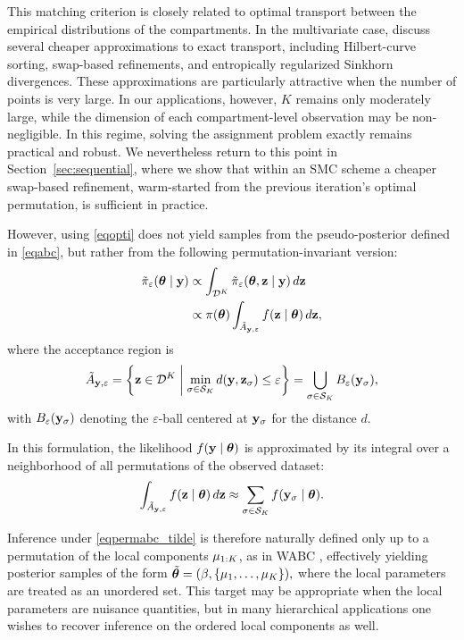 This matching criterion is closely related to optimal transport between the empirical distributions of the compartments. In the multivariate case, \citet{bernton2019approximate} discuss several cheaper approximations to exact transport, including Hilbert-curve sorting, swap-based refinements, and entropically regularized Sinkhorn divergences. These approximations are particularly attractive when the number of points is very large. In our applications, however, $K$ remains only moderately large, while the dimension of each compartment-level observation may be non-negligible. In this regime, solving the assignment problem exactly remains practical and robust. We nevertheless return to this point in Section~\ref{sec:sequential}, where we show that within an SMC scheme a cheaper swap-based refinement, warm-started from the previous iteration's optimal permutation, is sufficient in practice.

However, using \eqref{eqopti} does not yield samples from the pseudo-posterior defined in \eqref{eqabc}, but rather from the following permutation-invariant version:
\begin{equation}
    \label{eqpermabc_tilde}
    \begin{split}
        \Tilde \pi_{\varepsilon} (\boldsymbol{\theta} \mid \mathbf{y})
        &\propto \int_{\mathcal{D}^K} \Tilde \pi_{\varepsilon} (\boldsymbol{\theta},\mathbf{z} \mid \mathbf{y})\, d\mathbf{z} \\
        &\propto \pi(\boldsymbol{\theta})\int_{\Tilde A_{\mathbf{y},\varepsilon}} f(\mathbf{z} \mid \boldsymbol{\theta})\, d\mathbf{z},
    \end{split}
\end{equation}
where the acceptance region is
\[
\tilde{A}_{\mathbf{y},\varepsilon}
=
\left\{
\mathbf{z}\in\mathcal{D}^K \;\middle|\;
\min_{\sigma\in\mathcal{S}_K} d(\mathbf{y},\mathbf{z}_\sigma)\le \varepsilon
\right\}
=
\bigcup_{\sigma\in\mathcal{S}_K} B_\varepsilon(\mathbf{y}_\sigma),
\]
with \(B_\varepsilon(\mathbf{y}_\sigma)\) denoting the $\varepsilon$-ball centered at \(\mathbf{y}_\sigma\) for the distance \(d\).

In this formulation, the likelihood \(f(\mathbf{y}\mid\boldsymbol{\theta})\) is approximated by its integral over a neighborhood of all permutations of the observed dataset:
\[
\int_{\tilde A_{\mathbf{y},\varepsilon}} f(\mathbf{z}\mid\boldsymbol{\theta})\, d\mathbf{z}
\approx
\sum_{\sigma\in\mathcal{S}_K} f(\mathbf{y}_\sigma\mid\boldsymbol{\theta}).
\]

Inference under \eqref{eqpermabc_tilde} is therefore naturally defined only up to a permutation of the local components \( \mu_{1:K} \), as in WABC \citep{bernton2019approximate}, effectively yielding posterior samples of the form \(
\Tilde{\boldsymbol{\theta}}
=
(\beta,\{\mu_1,\dots,\mu_K\}),
\)
where the local parameters are treated as an unordered set. This target may be appropriate when the local parameters are nuisance quantities, but in many hierarchical applications one wishes to recover inference on the ordered local components as well.

